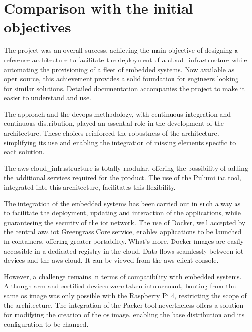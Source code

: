 \section{Comparison with the initial objectives}

The project was an overall success, achieving the main objective of designing a reference architecture to facilitate the deployment of a \gls{cloud_infrastructure} while automating the provisioning of a fleet of embedded systems. Now available as open source, this achievement provides a solid foundation for engineers looking for similar solutions. Detailed documentation accompanies the project to make it easier to understand and use.

The  approach and the \acrshort{devops} methodology, with continuous integration and continuous distribution, played an essential role in the development of the architecture. These choices reinforced the robustness of the architecture, simplifying its use and enabling the integration of missing elements specific to each solution.

The \gls{aws} \gls{cloud_infrastructure} is totally modular, offering the possibility of adding the additional services required for the product. The use of the Pulumi \acrshort{iac} tool, integrated into this architecture, facilitates this flexibility.

The integration of the embedded systems has been carried out in such a way as to facilitate the deployment, updating and interaction of the applications, while guaranteeing the security of the \acrshort{iot} network. The use of Docker, well accepted by the central \gls{aws} \acrshort{iot} Greengrass Core service, enables applications to be launched in containers, offering greater portability. What's more, Docker images are easily accessible in a dedicated registry in the \gls{cloud}. Data flows seamlessly between \acrshort{iot} devices and the \gls{aws} \gls{cloud}. It can be viewed from the \gls{aws} client console.

However, a challenge remains in terms of compatibility with embedded systems. Although \gls{arm} and  certified devices were taken into account, booting from the same \acrshort{os} image was only possible with the Raspberry Pi 4, restricting the scope of the architecture. The integration of the Packer tool nevertheless offers a solution for modifying the creation of the \acrshort{os} image, enabling the base distribution and its configuration to be changed.

